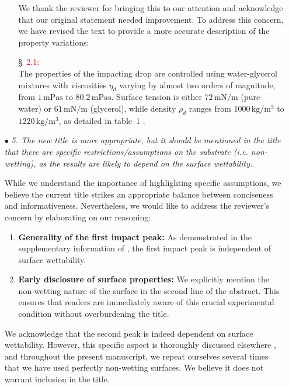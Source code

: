 \documentclass[]{article}
\newcommand*\red{\textcolor{red}}
\newcommand{\oo}{\color{magenta} \normalfont}
\newcommand{\bb}{\color{black} \normalfont}
\begin{document}
\begin{enumerate}
\begin{itemize}
		We thank the reviewer for bringing this to our attention and acknowledge that our original statement needed improvement.
		To address this concern, we have revised the text to provide a more accurate description of the property variations:
				
		\S~\red{2.1:}\\
		\oo
		The properties of the impacting drop are controlled using water-glycerol mixtures with viscosities $\eta_d$ varying by almost two orders of magnitude, from $1\,\si{\milli\pascal}\si{\second}$ to $80.2\,\si{\milli\pascal}\si{\second}$. Surface tension is either $72\,\si{\milli\newton}/\si{\meter}$ (pure water) or $61\,\si{\milli\newton}/\si{\meter}$ (glycerol), while density $\rho_d$ ranges from $1000\,\si{\kilo\gram}/\si{\cubic\meter}$ to $1220\,\si{\kilo\gram}/\si{\cubic\meter}$, as detailed in table~1 \citep{cheng2008formula, volk2018density, Jha2020}.
		\bb
	\end{itemize}
	
	\item[$\bullet$] \textit{5. The new title is more appropriate, but it should be mentioned in the title that there are specific restrictions/assumptions on the substrate (i.e. non-wetting), as the results are likely to depend on the surface wettability.}
	
	While we understand the importance of highlighting specific assumptions, we believe the current title strikes an appropriate balance between conciseness and informativeness. Nevertheless, we would like to address the reviewer's concern by elaborating on our reasoning:
	
	\begin{enumerate}
		\item \textbf{Generality of the first impact peak:} As demonstrated in the supplementary information of \citet{zhang2022impact}, the first impact peak is independent of surface wettability. 
		\item \textbf{Early disclosure of surface properties:} We explicitly mention the non-wetting nature of the surface in the second line of the abstract. This ensures that readers are immediately aware of this crucial experimental condition without overburdening the title.
	\end{enumerate}
	
	We acknowledge that the second peak is indeed dependent on surface wettability. 
	However, this specific aspect is thoroughly discussed elsewhere \citep{zhang2023effect}, and throughout the present manuscript, we repeat ourselves several times that we have used perfectly non-wetting surfaces.
	We believe it does not warrant inclusion in the title.
	

\end{enumerate}
\end{document}
